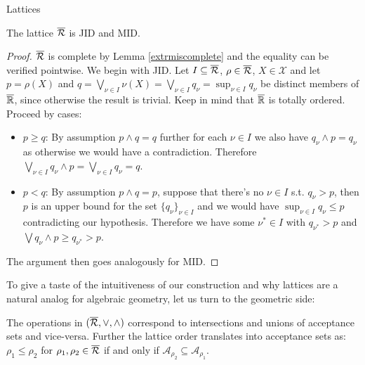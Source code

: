 \begin{subsection}{Lattices}
    \begin{lemma} \label{extrmisjidandmid}
       The lattice \( \overline{\mathcal{R}} \) is JID and MID.
    \end{lemma}
    \begin{proof}
        \( \overline{\mathcal{R}} \) is complete by Lemma \ref{extrmiscomplete} and the equality can be verified pointwise.
        We begin with JID. Let \( I \subseteq \overline{\mathcal{R}} \), \( \rho \in \overline{\mathcal{R}} \), \( X \in \mathcal{X} \)
        and let \( p = \rho(X) \) and \( q = \bigvee_{\nu \in I} \nu(X) = \bigvee_{\nu \in I} q_\nu = \sup_{\nu \in I} q_\nu \)
        be distinct members of \( \overline{\mathbb{R}} \), since otherwise the result is trivial. Keep in mind that \( \overline{\mathbb{R}} \) is totally ordered.
        Proceed by cases:
        \begin{itemize}
            \item \( p \geq q \): By assumption \( p \wedge q = q \) further for each \( \nu \in I \) we also have \( q_{\nu} \wedge p = q_{\nu} \)
                as otherwise we would have a contradiction. Therefore \( \bigvee_{\nu \in I} q_\nu \wedge p = \bigvee_{\nu \in I} q_\nu = q\).
            \item \( p < q \): By assumption \( p \wedge q = p \), suppose that there's no \( \nu \in I \) s.t. \( q_{\nu} > p \),
                then \( p \) is an upper bound for the set \( \{ q_{\nu} \}_{\nu \in I} \) and we would have \( \sup_{\nu \in I} q_{\nu} \leq p \)
                contradicting our hypothesis. Therefore we have some \( \nu^\ast \in I \) with \( q_{\nu^\ast} > p \) and \( \bigvee q_{\nu} \wedge p \geq q_{\nu^\ast} > p \).
        \end{itemize}
        The argument then goes analogously for MID.
    \end{proof}

    To give a taste of the intuitiveness of our construction and why lattices are a natural analog for algebraic geometry, let us turn to the geometric side:
    \begin{corollary} \label{acceptanceoperations}
        The operations in \( (\overline{\mathcal{R}}, \vee, \wedge) \) correspond to intersections and unions of acceptance sets
        and vice-versa. Further the lattice order translates into acceptance sets as: \( \rho_1 \leq \rho_2 \) for \( \rho_1, \rho_2 \in \overline{\mathcal{R}} \) if and only if \( \mathcal{A}_{\rho_2} \subseteq \mathcal{A}_{\rho_1} \).
    \end{corollary}

\end{subsection}
